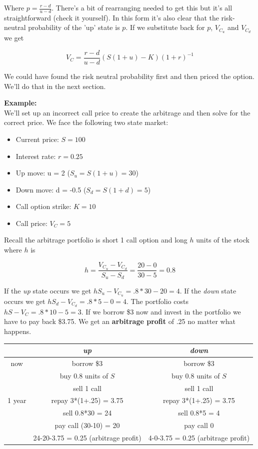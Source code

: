Where $p = \frac{r-d}{u-d}$. There's a bit of rearranging needed to get this but it's all straightforward (check it yourself). In this form it's also clear that the risk-neutral probability of the 'up' state is $p$. If we substitute back for $p$, $V_{C_u}$ and $V_{C_d}$ we get

\[V_{C} =\frac{r-d}{u-d} (S(1+u)-K)(1+r)^{-1}\]

We could have found the risk neutral probability first and then priced the option. We'll do that in the next section.
 
\textbf{Example:}\\

We'll set up an incorrect call price to create the arbitrage and then solve for the correct price. We face the following two state market:

\begin{itemize}
\item Current price:  $S = 100$
\item Interest rate: $r = 0.25$
\item Up move: u = 2 ($S_u =  S(1+u) = 30$)
\item Down move: d = -0.5 ($S_d = S(1+d) = 5$)
\item Call option strike: $K =10$ 
\item Call price: $V_C = 5$
\end{itemize}


Recall the arbitrage portfolio is short 1 call option and long $h$ units of the stock where $h$ is

\[ h = \frac{V_{C_u} - V_{C_d}}{S_u-S_d} = \frac{20 - 0}{30-5} = 0.8\]

If the \textit{up} state occurs we get $hS_u-V_{C_u} = .8*30-20 = 4$. If the \textit{down} state occurs we get  $hS_d-V_{C_d} = .8*5-0 = 4$. The portfolio costs $hS -V_{C} = .8*10-5 = 3$. If we borrow \$3 now and invest in the portfolio we have to pay back \$3.75. We get an \textbf{arbitrage profit} of .25 no matter what happens.

\begin{center} \begin{tabular}{|c|c|c|}
  \hline
  & \textit{up} & \textit{down}\\
  \hline
  now & borrow \$3 & borrow \$3 \\
           &buy 0.8 units of $S$ &buy 0.8 units of $S$\\
           &sell 1 call & sell 1 call\\
  \hline
  1 year & repay 3*(1+.25) = 3.75 & repay 3*(1+.25) = 3.75\\
              & sell 0.8*30 = 24 & sell 0.8*5 = 4\\
              & pay call (30-10) = 20 & pay call 0\\
  \hline
             & 24-20-3.75 = 0.25 (arbitrage profit) & 4-0-3.75 = 0.25 (arbitrage profit)\\
             \hline
\end{tabular}
\end{center}


